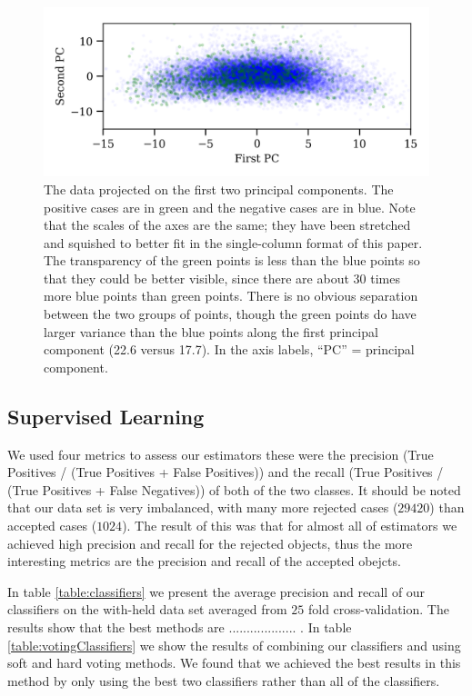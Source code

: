 \begin{figure}
\begin{centering}
\includegraphics[width=5in]{pca.png}
\caption{\label{pca} The data projected on the first two principal components.  The positive cases are in green and the negative cases are in blue.  Note that the scales of the axes are the same; they have been stretched and squished to better fit in the single-column format of this paper.  The transparency of the green points is less than the blue points so that they could be better visible, since there are about 30 times more blue points than green points.  There is no obvious separation between the two groups of points, though the green points do have larger variance than the blue points along the first principal component (22.6 versus 17.7).  In the axis labels, ``PC'' = principal component.}
\end{centering}
\end{figure}







\subsection{Supervised Learning}

We used four metrics to assess our estimators these were the precision (True Positives / (True Positives + False Positives)) and the recall  (True Positives / (True Positives + False Negatives)) of both of the two classes. It should be noted that our data set is very imbalanced, with many more rejected cases ($29420$) than accepted cases ($1024$). The result of this was that for almost all of estimators we achieved high precision and recall for the rejected objects, thus the more interesting metrics are the precision and recall of the accepted obejcts.

In table \ref{table:classifiers} we present the average precision and recall of our classifiers on the with-held data set averaged from $25$ fold cross-validation. The results show that the best methods are ................... . In table \ref{table:votingClassifiers} we show the results of combining our classifiers and using soft and hard voting methods. We found that we achieved the best results in this method by only using the best two classifiers rather than all of the classifiers.

